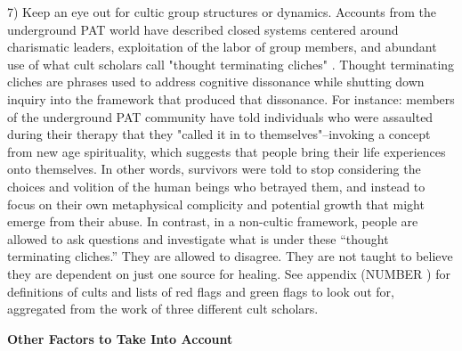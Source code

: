 \documentclass[12pt,letterpaper]{book}
\begin{document}
7) Keep an eye out for cultic group structures or dynamics. Accounts from the underground PAT world have described closed systems centered around charismatic leaders, exploitation of the labor of group members, and abundant use of what cult scholars call "thought terminating cliches" \cite{powerTrip,thoughtTerminating}. Thought terminating cliches are phrases used to address cognitive dissonance while shutting down inquiry into the framework that produced that dissonance. For instance: members of the underground PAT community have told individuals who were assaulted during their therapy that they "called it in to themselves"--invoking a concept from new age spirituality, which suggests that people bring their life experiences onto themselves. In other words, survivors were told to stop considering the choices and volition of the human beings who betrayed them, and instead to focus on their own metaphysical complicity and potential growth that might emerge from their abuse. In contrast, in a non-cultic framework, people are allowed to ask questions and investigate what is under these “thought terminating cliches.” They are allowed to disagree. They are not taught to believe they are dependent on just one source for healing. See appendix (NUMBER ) for definitions of cults and lists of red flags and green flags to look out for, aggregated from the work of three different cult scholars. 

\noindent \textbf{Other Factors to Take Into Account}
\end{document}
